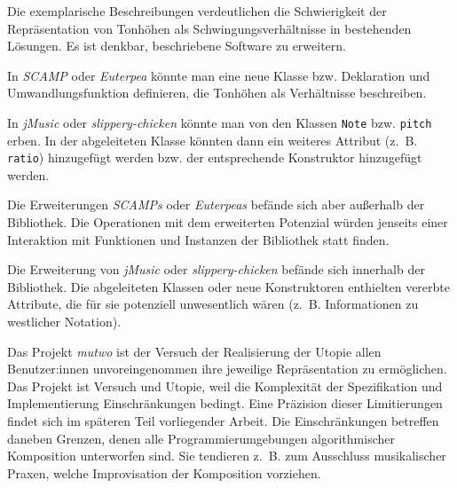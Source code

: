 \documentclass[12pt,a4paper,ngerman]{article}
\begin{document}
\bigskip

\noindent
Die exemplarische Beschreibungen verdeutlichen die Schwierigkeit der Repräsentation von Tonhöhen als Schwingungsverhältnisse in bestehenden Lösungen.
Es ist denkbar, beschriebene Software zu erweitern.

\smallskip

In \emph{SCAMP} oder \emph{Euterpea} könnte man eine neue Klasse bzw. Deklaration und Umwandlungsfunktion definieren, die Tonhöhen als Verhältnisse beschreiben.

\smallskip

In \emph{jMusic} oder \emph{slippery-chicken} könnte man von den Klassen \texttt{Note} bzw. \texttt{pitch} erben.
In der abgeleiteten Klasse könnten dann ein weiteres Attribut (z.~B. \texttt{ratio}) hinzugefügt werden bzw. der entsprechende Konstruktor hinzugefügt werden.

\smallskip

Die Erweiterungen \emph{SCAMPs} oder \emph{Euterpeas} befände sich aber außerhalb der Bibliothek.
Die Operationen mit dem erweiterten Potenzial würden jenseits einer Interaktion mit Funktionen und Instanzen der Bibliothek statt finden.

\smallskip

Die Erweiterung von \emph{jMusic} oder \emph{slippery-chicken} befände sich innerhalb der Bibliothek.
Die abgeleiteten Klassen oder neue Konstruktoren enthielten vererbte Attribute, die für sie potenziell unwesentlich wären (z.~B. Informationen zu westlicher Notation).

\bigskip

Das Projekt \emph{mutwo} ist der Versuch der Realisierung der Utopie allen Benutzer:innen unvoreingenommen ihre jeweilige Repräsentation zu ermöglichen.
Das Projekt ist Versuch und Utopie, weil die Komplexität der Spezifikation und Implementierung Einschränkungen bedingt.
Eine Präzision dieser Limitierungen findet sich im späteren Teil vorliegender Arbeit.
Die Einschränkungen betreffen daneben Grenzen, denen alle Programmierumgebungen algorithmischer Komposition unterworfen sind.
Sie tendieren z.~B. zum Ausschluss musikalischer Praxen, welche Improvisation der Komposition vorziehen.

\bigskip


\end{document}

